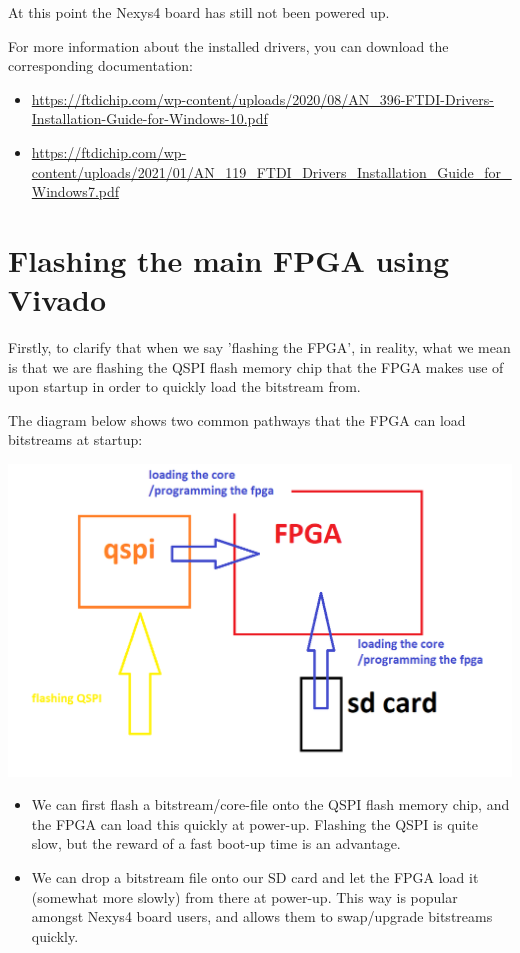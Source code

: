 At this point the Nexys4 board has still not been powered up.

For more information about the installed drivers, you can download the corresponding documentation:

\begin{itemize}
  \item \url{https://ftdichip.com/wp-content/uploads/2020/08/AN\_396-FTDI-Drivers-Installation-Guide-for-Windows-10.pdf}
  \item \url{https://ftdichip.com/wp-content/uploads/2021/01/AN\_119\_FTDI\_Drivers\_Installation\_Guide\_for\_Windows7.pdf}
\end{itemize}

\section{Flashing the main FPGA using Vivado}
\label{sec:mainfpgaflashing}

Firstly, to clarify that when we say 'flashing the FPGA', in reality, what we mean is that we are flashing the QSPI flash memory chip that the FPGA makes use of upon startup in order to quickly load the bitstream from.

The diagram below shows two common pathways that the FPGA can load bitstreams at startup:

\begin{center}
\includegraphics[width=0.8\linewidth]{images/flashing_fpga.png}
\end{center}

\begin{itemize}
  \item We can first flash a bitstream/core-file onto the QSPI flash memory chip, and the FPGA can load this quickly at power-up. Flashing the QSPI is quite slow, but the reward of a fast boot-up time is an advantage.
  \item We can drop a bitstream file onto our SD card and let the FPGA load it (somewhat more slowly) from there at power-up. This way is popular amongst Nexys4 board users, and allows them to swap/upgrade bitstreams quickly.
\end{itemize}

